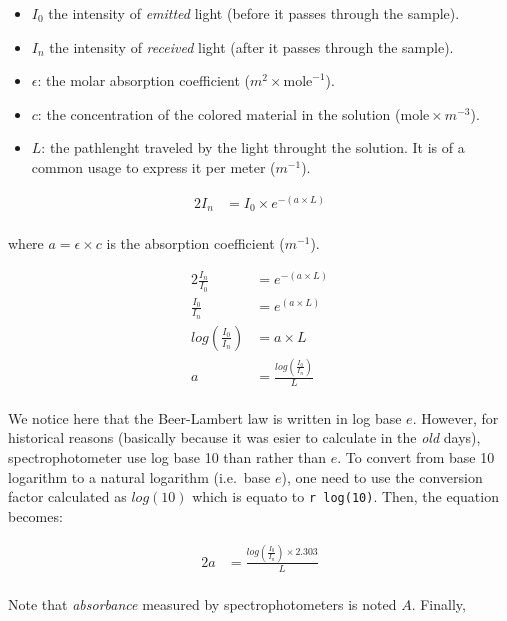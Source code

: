 \documentclass[]{book}
\providecommand{\tightlist}{%
  \setlength{\itemsep}{0pt}\setlength{\parskip}{0pt}}
\theoremstyle{definition}
\theoremstyle{definition}
\theoremstyle{remark}
\begin{document}
\begin{itemize}
\tightlist
\item
  \(I_0\) the intensity of \emph{emitted} light (before it passes
  through the sample).
\item
  \(I_n\) the intensity of \emph{received} light (after it passes
  through the sample).
\item
  \(\epsilon\): the molar absorption coefficient
  (\(m^2 \times \text{mole}^{-1}\)).
\item
  \(c\): the concentration of the colored material in the solution
  (\(\text{mole} \times m^{-3}\)).
\item
  \(L\): the pathlenght traveled by the light throught the solution. It
  is of a common usage to express it per meter (\(m^{-1}\)).
\end{itemize}

\begin{alignat}{2}
\label{eq:abs2}
    I_n &= I_0 \times e^{-(a \times L)}\\
\end{alignat}

where \(a = \epsilon \times c\) is the absorption coefficient
(\(m^{-1}\)).

\begin{alignat}{2}
\label{eq:abs3}
    \frac{I_n}{I_0}       &= e^{-(a \times L)}\\[10pt]
    \frac{I_0}{I_n}       &= e^{(a \times L)}\\[10pt]
    log(\frac{I_0}{I_n})  &= a \times L\\[10pt]
    a                     &= \frac{log(\frac{I_0}{I_n})}{L}\\
\end{alignat}

We notice here that the Beer-Lambert law is written in log base \(e\).
However, for historical reasons (basically because it was esier to
calculate in the \emph{old} days), spectrophotometer use log base 10
than rather than \(e\). To convert from base 10 logarithm to a natural
logarithm (i.e.~base \(e\)), one need to use the conversion factor
calculated as \(log(10)\) which is equato to \texttt{r\ log(10)}. Then,
the equation becomes:

\begin{alignat}{2}
\label{eq:abs4}
    a &= \frac{log(\frac{I_0}{I_n}) \times 2.303}{L}\\
\end{alignat}

Note that \emph{absorbance} measured by spectrophotometers is noted
\(A\). Finally,
\end{document}
